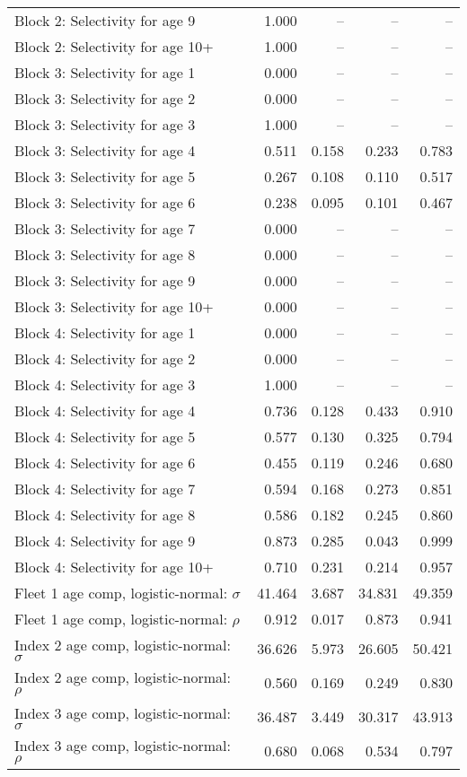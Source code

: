 \documentclass[
]{article}
\begin{document}
\begin{landscape}
\begin{longtable}[t]{lrrrr}
Block 2: Selectivity for age 9 & 1.000 & -- & -- & --\\
Block 2: Selectivity for age 10+ & 1.000 & -- & -- & --\\
Block 3: Selectivity for age 1 & 0.000 & -- & -- & --\\
Block 3: Selectivity for age 2 & 0.000 & -- & -- & --\\
\addlinespace
Block 3: Selectivity for age 3 & 1.000 & -- & -- & --\\
Block 3: Selectivity for age 4 & 0.511 & 0.158 & 0.233 & 0.783\\
Block 3: Selectivity for age 5 & 0.267 & 0.108 & 0.110 & 0.517\\
Block 3: Selectivity for age 6 & 0.238 & 0.095 & 0.101 & 0.467\\
Block 3: Selectivity for age 7 & 0.000 & -- & -- & --\\
\addlinespace
Block 3: Selectivity for age 8 & 0.000 & -- & -- & --\\
Block 3: Selectivity for age 9 & 0.000 & -- & -- & --\\
Block 3: Selectivity for age 10+ & 0.000 & -- & -- & --\\
Block 4: Selectivity for age 1 & 0.000 & -- & -- & --\\
Block 4: Selectivity for age 2 & 0.000 & -- & -- & --\\
\addlinespace
Block 4: Selectivity for age 3 & 1.000 & -- & -- & --\\
Block 4: Selectivity for age 4 & 0.736 & 0.128 & 0.433 & 0.910\\
Block 4: Selectivity for age 5 & 0.577 & 0.130 & 0.325 & 0.794\\
Block 4: Selectivity for age 6 & 0.455 & 0.119 & 0.246 & 0.680\\
Block 4: Selectivity for age 7 & 0.594 & 0.168 & 0.273 & 0.851\\
\addlinespace
Block 4: Selectivity for age 8 & 0.586 & 0.182 & 0.245 & 0.860\\
Block 4: Selectivity for age 9 & 0.873 & 0.285 & 0.043 & 0.999\\
Block 4: Selectivity for age 10+ & 0.710 & 0.231 & 0.214 & 0.957\\
Fleet 1 age comp, logistic-normal: $\sigma$ & 41.464 & 3.687 & 34.831 & 49.359\\
Fleet 1 age comp, logistic-normal: $\rho$ & 0.912 & 0.017 & 0.873 & 0.941\\
\addlinespace
Index 2 age comp, logistic-normal: $\sigma$ & 36.626 & 5.973 & 26.605 & 50.421\\
Index 2 age comp, logistic-normal: $\rho$ & 0.560 & 0.169 & 0.249 & 0.830\\
Index 3 age comp, logistic-normal: $\sigma$ & 36.487 & 3.449 & 30.317 & 43.913\\
Index 3 age comp, logistic-normal: $\rho$ & 0.680 & 0.068 & 0.534 & 0.797\\*
\end{longtable}
\end{landscape}
\end{document}
